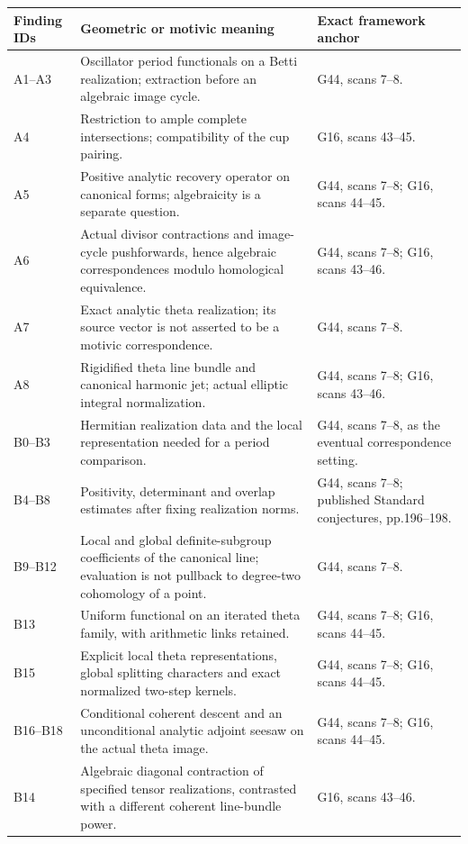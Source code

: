 \documentclass[11pt]{article}
\theoremstyle{definition}\newtheorem{definition}[theorem]{Definition}\newtheorem{remark}[theorem]{Remark}
\begin{document}
\begin{longtable}{@{}p{.18\linewidth}p{.48\linewidth}p{.27\linewidth}@{}}
\toprule Finding IDs & Geometric or motivic meaning & Exact framework anchor\\\midrule\endhead
A1--A3 & Oscillator period functionals on a Betti realization; extraction before an algebraic image cycle. & G44, scans 7--8.\\
A4 & Restriction to ample complete intersections; compatibility of the cup pairing. & G16, scans 43--45.\\
A5 & Positive analytic recovery operator on canonical forms; algebraicity is a separate question. & G44, scans 7--8; G16, scans 44--45.\\
A6 & Actual divisor contractions and image-cycle pushforwards, hence algebraic correspondences modulo homological equivalence. & G44, scans 7--8; G16, scans 43--46.\\
A7 & Exact analytic theta realization; its source vector is not asserted to be a motivic correspondence. & G44, scans 7--8.\\
A8 & Rigidified theta line bundle and canonical harmonic jet; actual elliptic integral normalization. & G44, scans 7--8; G16, scans 43--46.\\
B0--B3 & Hermitian realization data and the local representation needed for a period comparison. & G44, scans 7--8, as the eventual correspondence setting.\\
B4--B8 & Positivity, determinant and overlap estimates after fixing realization norms. & G44, scans 7--8; published Standard conjectures, pp.196--198.\\
B9--B12 & Local and global definite-subgroup coefficients of the canonical line; evaluation is not pullback to degree-two cohomology of a point. & G44, scans 7--8.\\
B13 & Uniform functional on an iterated theta family, with arithmetic links retained. & G44, scans 7--8; G16, scans 44--45.\\
B15 & Explicit local theta representations, global splitting characters and exact normalized two-step kernels. & G44, scans 7--8; G16, scans 44--45.\\
B16--B18 & Conditional coherent descent and an unconditional analytic adjoint seesaw on the actual theta image. & G44, scans 7--8; G16, scans 44--45.\\
B14 & Algebraic diagonal contraction of specified tensor realizations, contrasted with a different coherent line-bundle power. & G16, scans 43--46.\\

\end{longtable}
\end{document}
